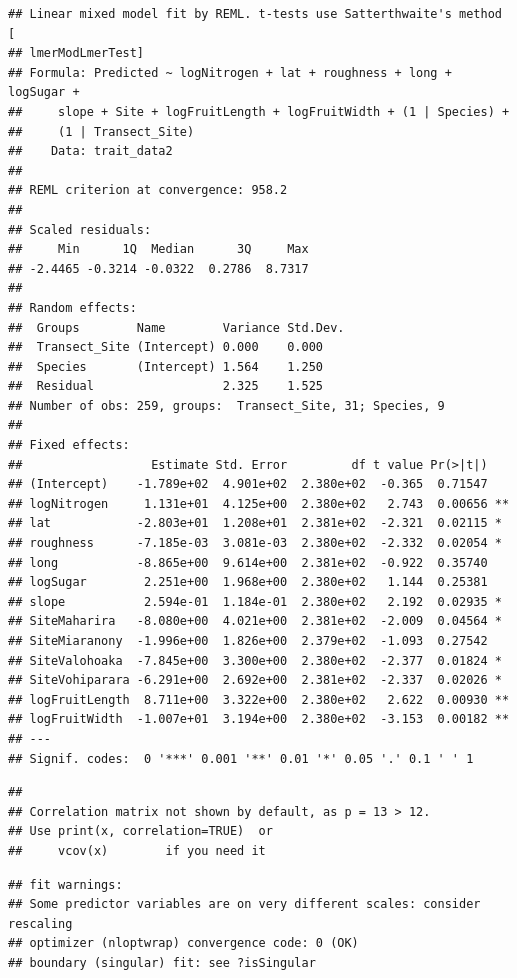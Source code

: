 \documentclass[
  12pt,
]{article}
\begin{document}
\begin{verbatim}
## Linear mixed model fit by REML. t-tests use Satterthwaite's method [
## lmerModLmerTest]
## Formula: Predicted ~ logNitrogen + lat + roughness + long + logSugar +  
##     slope + Site + logFruitLength + logFruitWidth + (1 | Species) +  
##     (1 | Transect_Site)
##    Data: trait_data2
## 
## REML criterion at convergence: 958.2
## 
## Scaled residuals: 
##     Min      1Q  Median      3Q     Max 
## -2.4465 -0.3214 -0.0322  0.2786  8.7317 
## 
## Random effects:
##  Groups        Name        Variance Std.Dev.
##  Transect_Site (Intercept) 0.000    0.000   
##  Species       (Intercept) 1.564    1.250   
##  Residual                  2.325    1.525   
## Number of obs: 259, groups:  Transect_Site, 31; Species, 9
## 
## Fixed effects:
##                  Estimate Std. Error         df t value Pr(>|t|)   
## (Intercept)    -1.789e+02  4.901e+02  2.380e+02  -0.365  0.71547   
## logNitrogen     1.131e+01  4.125e+00  2.380e+02   2.743  0.00656 **
## lat            -2.803e+01  1.208e+01  2.381e+02  -2.321  0.02115 * 
## roughness      -7.185e-03  3.081e-03  2.380e+02  -2.332  0.02054 * 
## long           -8.865e+00  9.614e+00  2.381e+02  -0.922  0.35740   
## logSugar        2.251e+00  1.968e+00  2.380e+02   1.144  0.25381   
## slope           2.594e-01  1.184e-01  2.380e+02   2.192  0.02935 * 
## SiteMaharira   -8.080e+00  4.021e+00  2.381e+02  -2.009  0.04564 * 
## SiteMiaranony  -1.996e+00  1.826e+00  2.379e+02  -1.093  0.27542   
## SiteValohoaka  -7.845e+00  3.300e+00  2.380e+02  -2.377  0.01824 * 
## SiteVohiparara -6.291e+00  2.692e+00  2.381e+02  -2.337  0.02026 * 
## logFruitLength  8.711e+00  3.322e+00  2.380e+02   2.622  0.00930 **
## logFruitWidth  -1.007e+01  3.194e+00  2.380e+02  -3.153  0.00182 **
## ---
## Signif. codes:  0 '***' 0.001 '**' 0.01 '*' 0.05 '.' 0.1 ' ' 1
\end{verbatim}

\begin{verbatim}
## 
## Correlation matrix not shown by default, as p = 13 > 12.
## Use print(x, correlation=TRUE)  or
##     vcov(x)        if you need it
\end{verbatim}

\begin{verbatim}
## fit warnings:
## Some predictor variables are on very different scales: consider rescaling
## optimizer (nloptwrap) convergence code: 0 (OK)
## boundary (singular) fit: see ?isSingular
\end{verbatim}
\end{document}
